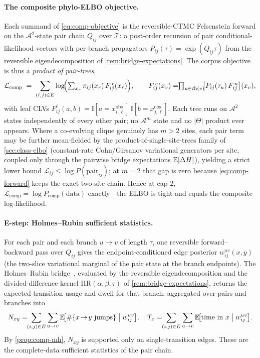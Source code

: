 \paragraph{The composite phylo-ELBO objective.} Each summand of
\eqref{eq:comp-objective} is the reversible-CTMC Felsenstein forward on the
$\mathcal{A}^2$-state pair chain $Q_{ij}$ over $\mathcal{T}$: a post-order
recursion of pair conditional-likelihood vectors with per-branch
propagators $P_{ij}(\tau)=\exp(Q_{ij}\tau)$ from the reversible
eigendecomposition of \autoref{rem:bridge-expectations}. The corpus
objective is thus a \emph{product of pair-trees},
\begin{equation}
  \mathcal{L}_{\mathrm{comp}}
    \;=\;\sum_{(i,j)\in E}\log\!\Bigl(
      \textstyle\sum_{x_r}\pi_{ij}(x_r)\,F^{\,r}_{ij}(x_r)\Bigr),
  \qquad
  F^{\,v}_{ij}(x_v)=\!\!\prod_{u\in\mathrm{ch}(v)}\!\!
     \bigl[P_{ij}(\tau_u)\,F^{\,u}_{ij}\bigr](x_v),
  \label{eq:comp-forward}
\end{equation}
with leaf CLVs $F^{\ell}_{ij}(a,b)=\mathbb{I}[a{=}x^{\mathrm{obs}}_{i,\ell}]\,
\mathbb{I}[b{=}x^{\mathrm{obs}}_{j,\ell}]$. Each tree runs on $\mathcal{A}^2$
states independently of every other pair; no $\mathcal{A}^m$ state and no
$|\Theta|$ product ever appears. Where a co-evolving clique genuinely has
$m>2$ sites, each pair term may be further mean-fielded by the
product-of-single-site-trees family of \autoref{sec:class-elbo} (constant-rate
Cohn/Girsanov variational generators per site, coupled only through the
pairwise bridge expectations $\mathbb{E}[\Delta H]$), yielding a strict lower
bound $\mathcal{L}_{ij}\le\log P(\text{pair}_{ij})$; at $m=2$ that gap is zero
because \eqref{eq:comp-forward} keeps the exact two-site chain. Hence at
cap-$2$, $\mathcal{L}_{\mathrm{comp}}=\log P_{\mathrm{comp}}(\text{data})$
exactly---the ELBO is tight and equals the composite log-likelihood.

\paragraph{E-step: Holmes--Rubin sufficient statistics.} For each pair and
each branch $u\!\to\!v$ of length $\tau$, one reversible forward--backward
pass over $Q_{ij}$ gives the endpoint-conditioned edge posterior
$w^{uv}_{ij}(x,y)$ (the two-slice variational marginal of the pair state at
the branch endpoints). The Holmes--Rubin bridge~\citep{HolmesRubin2002},
evaluated by the reversible eigendecomposition and the divided-difference
kernel $\mathrm{HR}(\alpha,\beta,\tau)$ of \autoref{rem:bridge-expectations},
returns the expected transition usage and dwell for that branch, aggregated
over pairs and branches into
\begin{equation}
  N_{xy}=\!\!\sum_{(i,j)\in E}\sum_{u\to v}
     \expect\!\bigl[\#\{x\!\to\!y\text{ jumps}\}\;\big|\;w^{uv}_{ij}\bigr],
  \quad
  T_x=\!\!\sum_{(i,j)\in E}\sum_{u\to v}
     \expect\!\bigl[\text{time in }x\;\big|\;w^{uv}_{ij}\bigr].
  \label{eq:comp-hr}
\end{equation}
By \autoref{prop:comp-mh}, $N_{xy}$ is supported only on single-transition
edges. These are the complete-data sufficient statistics of the pair chain.

